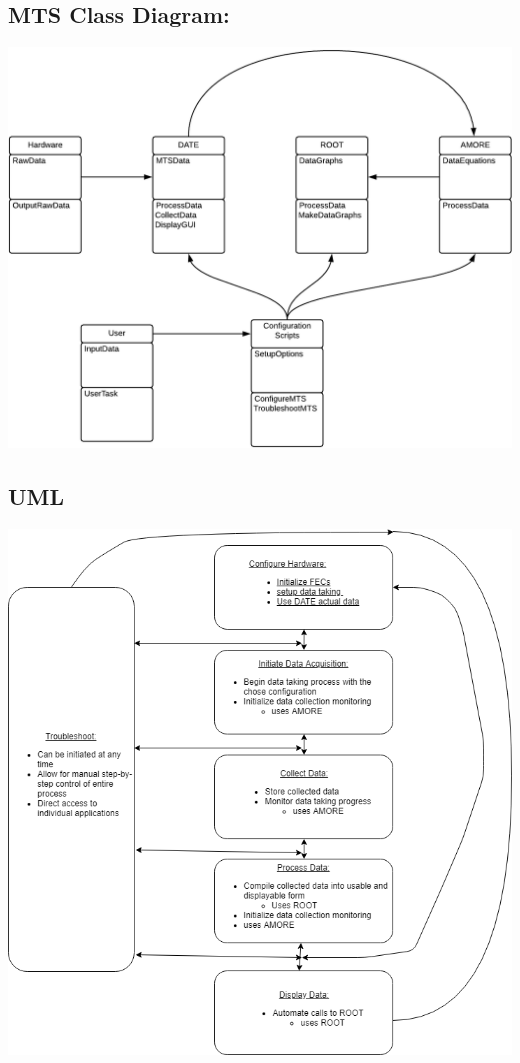\documentclass[12pt]{article}
\begin{document}
\newpage
\subsection*{MTS Class Diagram:} 
%
\includegraphics[scale=.90]{MTSCLASS.png}
\newline \\
\subsection*{UML}
%
\includegraphics[scale=.6]{DIAGRAM.png}
\end{document}

